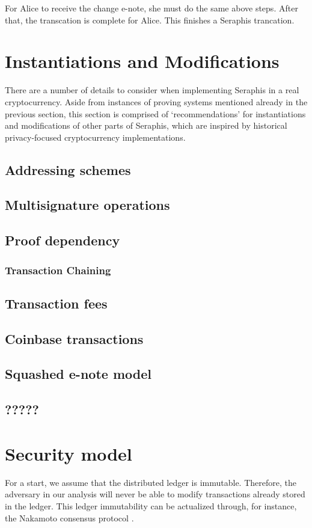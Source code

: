 \documentclass{article}
\begin{document}
For Alice to receive the change e-note, she must do the same above steps. After that, the transcation is complete for Alice. This finishes a Seraphis trancation.

\section{Instantiations and Modifications}\label{inst}
There are a number of details to consider when implementing Seraphis in a real cryptocurrency. Aside from instances of proving systems mentioned already in the previous section, this section is comprised of `recommendations' for instantiations and modifications of other parts of Seraphis, which are inspired by historical privacy-focused cryptocurrency implementations.

\subsection{Addressing schemes}\label{addr-scheme}
\subsection{Multisignature operations}
\subsection{Proof dependency}\label{proof-dep}
\subsubsection*{Transaction Chaining}
\subsection{Transaction fees}
\subsection{Coinbase transactions}
\subsection{Squashed e-note model}
\subsection{?????}

\section{Security model}\label{sec}
For a start, we assume that the distributed ledger is immutable. Therefore, the adversary in our analysis will never be able to modify transactions already stored in the ledger. This ledger immutability can be actualized through, for instance, the Nakamoto consensus protocol \cite{bitcoin}.
\end{document}

